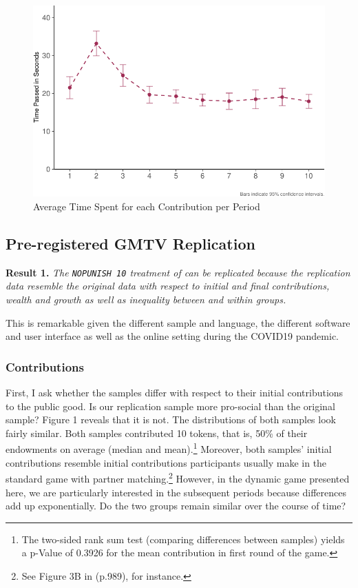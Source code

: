 \documentclass[
  authoryear,
  preprint,
  3p]{elsarticle}
\begin{document}
\begin{figure}

{\centering \includegraphics{paper_files/figure-pdf/plotTime-1.pdf}

}

\caption{Average Time Spent for each Contribution per Period}

\end{figure}

\hypertarget{pre-registered-gmtv-replication}{%
\subsection{Pre-registered GMTV
Replication}\label{pre-registered-gmtv-replication}}

\textbf{Result 1.} \emph{The \texttt{NOPUNISH\ 10} treatment of
\citet{GMTV2017} can be replicated because the replication data resemble
the original data with respect to initial and final contributions,
wealth and growth as well as inequality between and within groups.}

This is remarkable given the different sample and language, the
different software and user interface as well as the online setting
during the COVID19 pandemic.

\hypertarget{contributions}{%
\subsubsection{Contributions}\label{contributions}}

First, I ask whether the samples differ with respect to their initial
contributions to the public good. Is our replication sample more
pro-social than the original sample? Figure 1 reveals that it is not.
The distributions of both samples look fairly similar. Both samples
contributed 10 tokens, that is, 50\% of their endowments on average
(median and mean).\footnote{The two-sided rank sum test (comparing
  differences between samples) yields a p-Value of 0.3926 for the mean
  contribution in first round of the game.} Moreover, both samples'
initial contributions resemble initial contributions participants
usually make in the standard game with partner matching.\footnote{See
  Figure 3B in \citet{fehrgaechter2000} (p.989), for instance.} However,
in the dynamic game presented here, we are particularly interested in
the subsequent periods because differences add up exponentially. Do the
two groups remain similar over the course of time?
\end{document}
